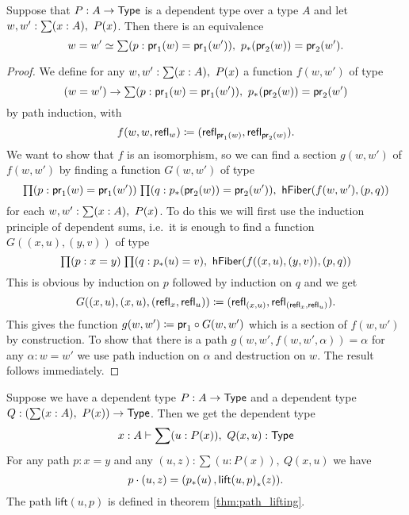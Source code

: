 \begin{thm}
Suppose that $P:A\to\mathsf{Type}$ is a dependent type over a type $A$ and let $w,w^\prime:\sm{x:A}P(x)$. Then there is an equivalence
\begin{equation*}
\eqv{w=w'}{\sm{p:\proj{1}(w)=\proj{1}(w')}\trans{p}{\proj{2}(w)}=\proj{2}(w^\prime)}.
\end{equation*}
\end{thm}

\begin{proof}
We define for any $w,w':\sm{x:A}P(x)$ a function $f(w,w')$ of type
\begin{equation*}
(w=w')\to\sm{p:\proj{1}(w)=\proj{1}(w')}\trans{p}{\proj{2}(w)}=\proj{2}(w^\prime)
\end{equation*}
by path induction, with 
\begin{equation*}
f(w,w,\mathsf{refl}_{w})\coloneqq(\mathsf{refl}_{\mathsf{pr}_{1}(w)},\mathsf{refl}_{\mathsf{pr}_{2}(w)}).
\end{equation*}
We want to show that $f$ is an isomorphism, so we can find a section $g(w,w')$ of $f(w,w')$ by finding a function $G(w,w')$ of type
\begin{equation*}
\prd{p:\proj 1(w)=\proj 1(w')}{q:\trans p{\proj 2(w)}=\proj 2(w')}\mathsf{hFiber}(f(w,w'),(p,q))
\end{equation*}
for each $w,w':\sm{x:A}P(x)$. To do this we will first use the induction principle of dependent sums, i.e.\ it is enough to find a function $G((x,u),(y,v))$ of type
\begin{equation*}
\prd{p:x=y}{q:\trans{p}{u}=v}\hfiber{f((x,u),(y,v))}{(p,q)}
\end{equation*}
This is obvious by induction on $p$ followed by induction on $q$ and we get
\begin{equation*}
G((x,u),(x,u),(\mathsf{refl}_{x},\mathsf{refl}_{u}))\coloneqq(\mathsf{refl}_{(x,u)},\mathsf{refl}_{(\mathsf{refl}_{x},\mathsf{refl}_{u})}).
\end{equation*}
This gives the function $g(w,w')\coloneqq\mathsf{pr}_{1}\circ G(w,w')$ which is a section of $f(w,w')$ by construction. To show that there is a path $g(w,w',f(w,w',\alpha))=\alpha$ for any $\alpha:w=w'$ we use path induction on $\alpha$ and destruction on $w$. The result follows immediately.
\end{proof}

\begin{thm}
Suppose we have a dependent type $P:A\to\mathsf{Type}$ and a dependent type $Q:(\sum(x:A),\ P(x))\to\mathsf{Type}$. Then we get the dependent type
\begin{equation*}
x:A\vdash \sum(u:P(x)),\ Q(x,u):\type
\end{equation*}
For any path $p:x=y$ and any $(u,z):\sum(u:P(x)),\ Q(x,u)$ we have
\begin{equation*}
p\cdot(u,z)=({p}_{*}\!\left({u}\right),{\mathsf{lift}(u,p)}_{*}\!\left({z}\right)).
\end{equation*}
The path $\mathsf{lift}(u,p)$ is defined in theorem \ref{thm:path_lifting}.
\end{thm}

